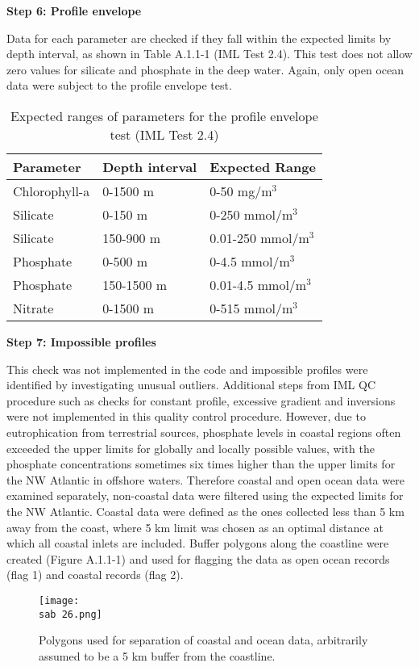 \documentclass[letterpaper,portrait,11pt]{scrartcl}
\numberwithin{equation}{section}		%
\numberwithin{figure}{section}			%
\numberwithin{table}{section}				%
\newcommand{\ecomod}{\string~/ecomod_data/}   %
\newcommand{\sab}{\ecomod/mpa/sab/}   %
\begin{document}
\begin{appendices}
\textbf{Step 6: Profile envelope}

Data  for each parameter are checked if they fall within the expected limits by depth interval, as shown in Table A.1.1-1 (IML Test 2.4). This test does not allow zero values for silicate and phosphate in the deep water. Again, only open ocean data were subject to the profile envelope test.

\begin{table}[h]
\label{tableBioChemQC}
\caption{Expected ranges of parameters for the profile envelope test (IML Test 2.4)}
\begin{tabular}{lll}
Parameter & Depth interval & Expected Range \\
\hline
Chlorophyll-a & 0-1500 m & 0-50 mg/m$^{3}$ \\
Silicate & 0-150 m & 0-250 mmol/m$^{3}$ \\
Silicate & 150-900 m & 0.01-250 mmol/m$^{3}$ \\
Phosphate & 0-500 m & 0-4.5 mmol/m$^{3}$ \\
Phosphate & 150-1500 m & 0.01-4.5 mmol/m$^{3}$ \\
Nitrate & 0-1500 m & 0-515 mmol/m$^{3}$ \\
\end{tabular}
\end{table}


\textbf{Step 7: Impossible profiles}

This check was not implemented in the code and impossible profiles were identified by investigating unusual outliers.
Additional steps from IML QC procedure such as checks for constant profile, excessive gradient and inversions were not implemented in this quality control procedure. However, due to eutrophication from terrestrial sources, phosphate levels in coastal regions often exceeded the upper limits for globally and locally possible values, with the phosphate concentrations sometimes six times higher than the upper limits for the NW Atlantic in offshore waters. Therefore coastal and open ocean data were examined separately, non-coastal data were filtered using the expected limits for the NW Atlantic. Coastal data were defined as the ones collected less than 5 km away from the coast, where 5 km limit was chosen as an optimal distance at which all coastal inlets are included. Buffer polygons along the coastline were created (Figure A.1.1-1) and used for flagging the data as open ocean records (flag 1) and coastal records (flag 2).

\begin{figure}
  \centering
  \texttt{[image: \\sab 26.png]}
  \caption{Polygons used for separation of coastal and ocean data, arbitrarily assumed to be a 5 km buffer from the coastline.}
  \label{figA.1.1-1}
\end{figure}




\end{appendices}
\end{document}
